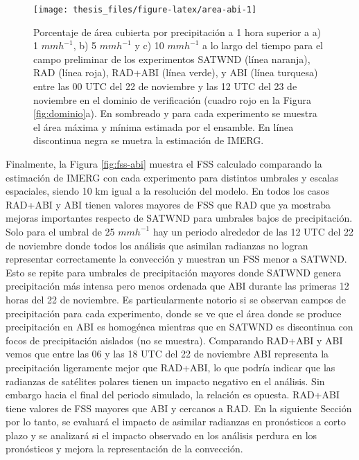 \documentclass[12pt,oneside,a4paper]{reedthesis}
\begin{document}
\begin{figure}
\texttt{[image: thesis\_files/figure-latex/area-abi-1]} \caption{Porcentaje de área cubierta por precipitación a 1 hora superior a a) 1 \(mmh^{-1}\), b) 5 \(mmh^{-1}\) y c) 10 \(mmh^{-1}\) a lo largo del tiempo para el campo preliminar de los experimentos SATWND (línea naranja), RAD (línea roja), RAD+ABI (línea verde), y ABI (línea turquesa) entre las 00 UTC del 22 de noviembre y las 12 UTC del 23 de noviembre en el dominio de verificación (cuadro rojo en la Figura \ref{fig:dominio}a). En sombreado y para cada experimento se muestra el área máxima y mínima estimada por el ensamble. En línea discontinua negra se muetra la estimación de IMERG.}\label{fig:area-abi}
\end{figure}
Finalmente, la Figura \ref{fig:fss-abi} muestra el FSS calculado comparando la estimación de IMERG con cada experimento para distintos umbrales y escalas espaciales, siendo 10 km igual a la resolución del modelo. En todos los casos RAD+ABI y ABI tienen valores mayores de FSS que RAD que ya mostraba mejoras importantes respecto de SATWND para umbrales bajos de precipitación. Solo para el umbral de 25 \(mmh^{-1}\) hay un periodo alrededor de las 12 UTC del 22 de noviembre donde todos los análisis que asimilan radianzas no logran representar correctamente la convección y muestran un FSS menor a SATWND. Esto se repite para umbrales de precipitación mayores donde SATWND genera precipitación más intensa pero menos ordenada que ABI durante las primeras 12 horas del 22 de noviembre. Es particularmente notorio si se observan campos de precipitación para cada experimento, donde se ve que el área donde se produce precipitación en ABI es homogénea mientras que en SATWND es discontinua con focos de precipitación aislados (no se muestra). Comparando RAD+ABI y ABI vemos que entre las 06 y las 18 UTC del 22 de noviembre ABI representa la precipitación ligeramente mejor que RAD+ABI, lo que podría indicar que las radianzas de satélites polares tienen un impacto negativo en el análisis. Sin embargo hacia el final del periodo simulado, la relación es opuesta. RAD+ABI tiene valores de FSS mayores que ABI y cercanos a RAD. En la siguiente Sección por lo tanto, se evaluará el impacto de asimilar radianzas en pronósticos a corto plazo y se analizará si el impacto observado en los análisis perdura en los pronósticos y mejora la representación de la convección.
\end{document}
